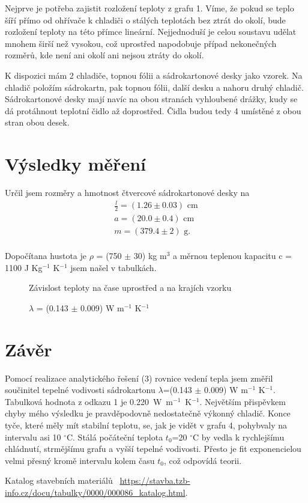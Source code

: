 \documentclass[a4paper,11pt]{article}
\begin{document}
Nejprve je potřeba zajistit rozložení teploty z grafu 1. Víme, že pokud se teplo šíří přímo od ohřívače k chladiči o stálých teplotách bez ztrát do okolí, bude rozložení teploty na této přímce lineární. Nejjednoduší je celou soustavu udělat mnohem širší než vysokou, což uprostřed napodobuje případ nekonečných rozměrů, kde není ani okolí ani nejsou ztráty do okolí.

K dispozici mám 2 chladiče, topnou fólii a sádrokartonové desky jako vzorek. Na chladič položím sádrokartn, pak topnou fólii, další desku a nahoru druhý chladič. Sádrokartonové desky mají navíc na obou stranách vyhloubené drážky, kudy se dá protáhnout teplotní čidlo až doprostřed. Čidla budou tedy 4 umístěné z obou stran obou desek. 

\section{Výsledky měření}

Určil jsem rozměry a hmotnost čtvercové sádrokartonové desky na
\begin{align*}
  \frac{l}{2} = (1.26 \pm 0.03) \text{ cm} \\
  a = (20.0 \pm 0.4) \text{ cm} \\
  m = (379.4 \pm 2) \text{ g.} \\
\end{align*}

Dopočítana hustota je $\rho$ = (750 $\pm$ 30) kg m$^3$ a měrnou teplenou kapacitu c = 1100 J Kg$^{-1}$ K$^{-1}$ jsem našel v tabulkách.


\begin{figure}[htpb]
  \centering
  
  \caption{Závislost teploty na čase uprostřed a na krajích vzorku }
  \caption*{$\lambda$ = (0.143 $\pm$ 0.009) W m$^{-1}$ K$^{-1}$}
\end{figure}

\section{Závěr}

Pomocí realizace analytického řešení (3) rovnice vedení tepla jsem změřil součinitel tepelné vodivosti sádrokartonu $\lambda$=(0.143 $\pm$ 0.009) W m$^{-1}$ K$^{-1}$. Tabulková hodnota z odkazu 1 je 0.220~W~m$^{-1}$~K$^{-1}$. Největším přispěvkem chyby mého výsledku je pravděpodovně nedostatečně výkonný chladič. Konce tyče, které měly mít stabilní teplotu, se, jak je vidět v grafu 4, pohybvaly na intervalu asi 10 $^{\circ}$C. Stálá počáteční teplota $t_0$=20 $^{\circ}$C by vedla k rychlejšímu chládnutí, strmějšímu grafu a vyšší tepelné vodivosti. Přesto je fit exponencielou velmi přesný kromě intervalu kolem času $t_0$, což odpovídá teorii. 

\begin{thebibliography}{0}
 Katalog stavebních materiálů ~\url{https://stavba.tzb-info.cz/docu/tabulky/0000/000086_katalog.html}.   
\end{thebibliography}
\end{document}
